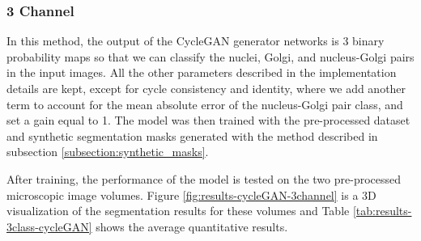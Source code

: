 \subsubsection*{3 Channel}
In this method, the output of the CycleGAN generator networks is 3 binary probability maps so that we can classify the nuclei, Golgi, and nucleus-Golgi pairs in the input images. All the other parameters described in the implementation details are kept, except for cycle consistency and identity, where we add another term to account for the mean absolute error of the nucleus-Golgi pair class, and set a gain equal to 1. The model was then trained with the pre-processed dataset and synthetic segmentation masks generated with the method described in subsection \ref{subsection:synthetic_masks}.

After training, the performance of the model is tested on the two pre-processed microscopic image volumes. Figure \ref{fig:results-cycleGAN-3channel} is a \ac{3D} visualization of the segmentation results for these volumes and Table \ref{tab:results-3class-cycleGAN} shows the average quantitative results.

\begin{table}[!htb]
\centering
\caption{Average metric values obtained from testing the 3 class unsupervised CycleGAN model on two pre-processed microscopic images.}
\label{tab:results-3class-cycleGAN}
\end{table}

